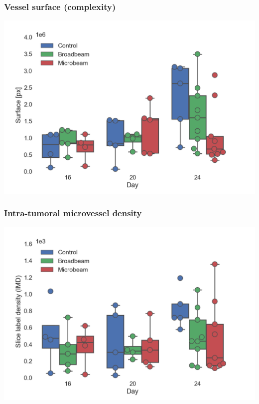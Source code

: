 \documentclass[draft]{beamer}
\newcommand{\imsize}{\linewidth} %
\begin{document}
\begin{frame}
	\frametitle{Vessel surface (complexity)}
	\includegraphics[width=\imsize]{img/talk_surface_day}	
\end{frame}

\begin{frame}
	\frametitle{Intra-tumoral microvessel density}
	\includegraphics[width=\imsize]{img/talk_imd_day}	
\end{frame}
\end{document}
